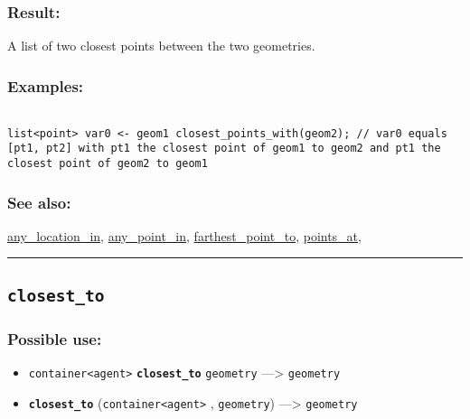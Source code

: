 \documentclass[]{book}
\providecommand{\tightlist}{%
  \setlength{\itemsep}{0pt}\setlength{\parskip}{0pt}}
\theoremstyle{definition}
\theoremstyle{definition}
\theoremstyle{definition}
\theoremstyle{remark}
\begin{document}
\subsubsection{Result:}\label{result-86}

A list of two closest points between the two geometries.

\subsubsection{Examples:}\label{examples-67}

\begin{verbatim}
 
list<point> var0 <- geom1 closest_points_with(geom2); // var0 equals [pt1, pt2] with pt1 the closest point of geom1 to geom2 and pt1 the closest point of geom2 to geom1
\end{verbatim}

\subsubsection{See also:}\label{see-also-53}

\href{OperatorsAA\#any_location_in}{any\_location\_in},
\href{OperatorsAA\#any_point_in}{any\_point\_in},
\href{OperatorsDH\#farthest_point_to}{farthest\_point\_to},
\href{OperatorsNR\#points_at}{points\_at},

\begin{center}\rule{0.5\linewidth}{\linethickness}\end{center}

\subsection{\texorpdfstring{\texttt{closest\_to}}{closest\_to}}\label{closest_to}

\subsubsection{Possible use:}\label{possible-use-89}

\begin{itemize}
\tightlist
\item
  \texttt{container\textless{}agent\textgreater{}}
  \textbf{\texttt{closest\_to}} \texttt{geometry} ---\textgreater{}
  \texttt{geometry}
\item
  \textbf{\texttt{closest\_to}}
  (\texttt{container\textless{}agent\textgreater{}} , \texttt{geometry})
  ---\textgreater{} \texttt{geometry}
\end{itemize}
\end{document}
